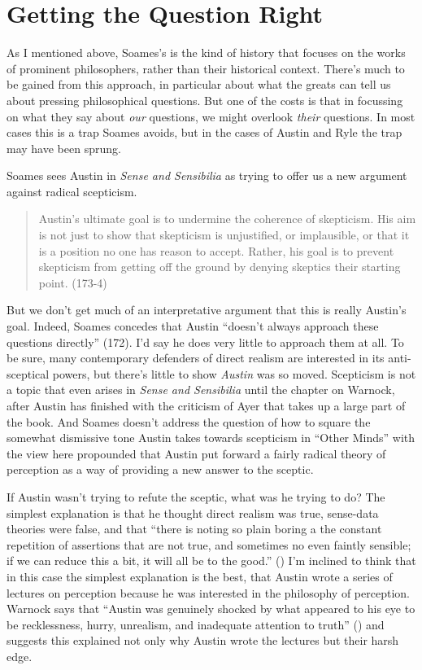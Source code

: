 \documentclass[
  10pt,
  letterpaper,
  DIV=11,
  numbers=noendperiod,
  twoside]{scrartcl}
\begin{document}
\section{Getting the Question Right}\label{getting-the-question-right}

As I mentioned above, Soames's is the kind of history that focuses on
the works of prominent philosophers, rather than their historical
context. There's much to be gained from this approach, in particular
about what the greats can tell us about pressing philosophical
questions. But one of the costs is that in focussing on what they say
about \emph{our} questions, we might overlook \emph{their} questions. In
most cases this is a trap Soames avoids, but in the cases of Austin and
Ryle the trap may have been sprung.

Soames sees Austin in \emph{Sense and Sensibilia} as trying to offer us
a new argument against radical scepticism.

\begin{quote}
Austin's ultimate goal is to undermine the coherence of skepticism. His
aim is not just to show that skepticism is unjustified, or implausible,
or that it is a position no one has reason to accept. Rather, his goal
is to prevent skepticism from getting off the ground by denying skeptics
their starting point. (173-4)
\end{quote}

But we don't get much of an interpretative argument that this is really
Austin's goal. Indeed, Soames concedes that Austin ``doesn't always
approach these questions directly'' (172). I'd say he does very little
to approach them at all. To be sure, many contemporary defenders of
direct realism are interested in its anti-sceptical powers, but there's
little to show \emph{Austin} was so moved. Scepticism is not a topic
that even arises in \emph{Sense and Sensibilia} until the chapter on
Warnock, after Austin has finished with the criticism of Ayer that takes
up a large part of the book. And Soames doesn't address the question of
how to square the somewhat dismissive tone Austin takes towards
scepticism in ``Other Minds'' with the view here propounded that Austin
put forward a fairly radical theory of perception as a way of providing
a new answer to the sceptic.

If Austin wasn't trying to refute the sceptic, what was he trying to do?
The simplest explanation is that he thought direct realism was true,
sense-data theories were false, and that ``there is noting so plain
boring a the constant repetition of assertions that are not true, and
sometimes no even faintly sensible; if we can reduce this a bit, it will
all be to the good.'' () I'm
inclined to think that in this case the simplest explanation is the
best, that Austin wrote a series of lectures on perception because he
was interested in the philosophy of perception. Warnock says that
``Austin was genuinely shocked by what appeared to his eye to be
recklessness, hurry, unrealism, and inadequate attention to truth''
() and suggests this
explained not only why Austin wrote the lectures but their harsh edge.
\end{document}
